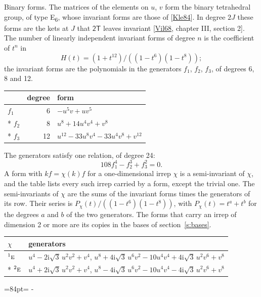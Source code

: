\documentclass[10pt,a4paper]{article}
\makeatletter
\renewcommand\paragraph{\@startsection{paragraph}{4}{\z@}{1.5ex plus .5ex minus .2ex}{-1em}%
  {\normalfont\small\sffamily\bfseries\color{parttitle}}}
\newcommand{\needspace}[1]{\par\penalty-100\begingroup\dimen0=#1\relax\dimen2=\pagegoal
  \advance\dimen2-\pagetotal\ifdim\dimen0>\dimen2\relax\ifdim\dimen2>0pt\vfil\break\fi\fi
  \endgroup}
\numberwithin{equation}{section}
\newcommand{\grp}[1]{\mathsf{#1}}
\newcommand{\irr}[1]{\text{\normalfont\scshape #1}}
\newcommand{\conjpair}[1]{{}^{#1}}
\newcommand{\iunit}{\mathrm{i}}
\makeatother
\begin{document}
\paragraph{Binary forms.}
The matrices of the elements on $u$, $v$ form the binary tetrahedral group, of type E\textsubscript{6}, whose invariant forms are those of [\href{../../../REFERENCES.pdf\#ref.Kle84}{Kle84}]. In degree $2J$ these forms are the kets at $J$ that $\grp{2T}$ leaves invariant [\href{../../../REFERENCES.pdf\#ref.Vil68}{Vil68}, chapter III, section 2]. \label{n:head.degree}\label{n:head.form}The number of linearly independent invariant forms of degree $n$ is the coefficient of $t^n$ in
\begin{equation}\label{e:molien}H(t) = (1 + t^{12})/((1-t^{6})(1-t^{8}));\end{equation}
the invariant forms are the polynomials in the generators $f_1$, $f_2$, $f_3$, of degrees 6, 8 and 12.
{\small\begin{longtable}{@{}lrl@{}}\toprule
& degree & form\\\midrule\endhead
\bottomrule\endfoot\endlastfoot
$f_{1}$ & 6 & $-u^{5}v + uv^{5}$\\*
$f_{2}$ & 8 & $u^{8} + 14u^{4}v^{4} + v^{8}$\\*
$f_{3}$ & 12 & $u^{12} - 33u^{8}v^{4} - 33u^{4}v^{8} + v^{12}$\\
\bottomrule\end{longtable}}
The generators satisfy one relation, of degree 24:
\begin{equation}\label{e:relation}108f_{1}^{4} - f_{2}^{3} + f_{3}^{2} = 0.\end{equation}
A form with $k f = \chi(k) f$ for a one-dimensional irrep $\chi$ is a semi-invariant of $\chi$, and the table lists every such irrep carried by a form, except the trivial one. \label{n:head.generators}The semi-invariants of $\chi$ are the sums of the invariant forms times the generators of its row. Their series is $P_\chi(t)/((1-t^{6})(1-t^{8}))$, with $P_\chi(t) = t^{a} + t^{b}$ for the degrees $a$ and $b$ of the two generators. The forms that carry an irrep of dimension 2 or more are its copies in the bases of section~\ref{s:bases}.
{\small\begin{longtable}{@{}ll@{}}\toprule
$\chi$ & generators\\\midrule\endhead
\bottomrule\endfoot\endlastfoot
$\conjpair{1}\irr{e}$ & $u^{4} - 2\iunit\sqrt{3}\,u^{2}v^{2} + v^{4}$, $u^{8} + 4\iunit\sqrt{3}\,u^{6}v^{2} - 10u^{4}v^{4} + 4\iunit\sqrt{3}\,u^{2}v^{6} + v^{8}$\\*
$\conjpair{2}\irr{e}$ & $u^{4} + 2\iunit\sqrt{3}\,u^{2}v^{2} + v^{4}$, $u^{8} - 4\iunit\sqrt{3}\,u^{6}v^{2} - 10u^{4}v^{4} - 4\iunit\sqrt{3}\,u^{2}v^{6} + v^{8}$\\
\bottomrule\end{longtable}}
\needspace{84pt}
\end{document}
